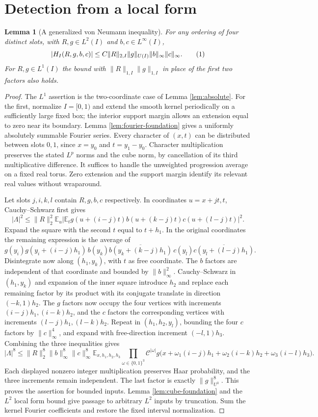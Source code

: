 \documentclass[11pt]{article}
\newtheorem{lemma}[theorem]{Lemma}
\theoremstyle{definition}
\newcommand{\E}{\mathbb E}
\newcommand{\eqtag}[1]{\refstepcounter{equation}\tag{\theequation}\label{#1}}
\numberwithin{equation}{section}
\begin{document}
\section{Detection from a local form}\label{sec:detection}
\begin{lemma}[A generalized von Neumann inequality]\label{lem:von-neumann}
For any ordering of four distinct slots, with $R,g\in L^2(I)$ and $b,c\in L^\infty(I)$,
\[
 |H_I(R,g,b,c)|\le C\|R\|_{2,I}\|g\|_{U(I)}\|b\|_\infty\|c\|_\infty.
 \eqtag{eq:von-neumann}
\]
For $R,g\in L^1(I)$ the bound with $\|R\|_{1,I}\|g\|_{1,I}$ in place of the first two factors also holds.
\end{lemma}
\begin{proof}
The $L^1$ assertion is the two-coordinate case of Lemma \ref{lem:absolute}. For the first, normalize $I=[0,1)$ and extend the smooth kernel periodically on a sufficiently large fixed box; the interior support margin allows an extension equal to zero near its boundary. Lemma \ref{lem:fourier-foundation} gives a uniformly absolutely summable Fourier series. Every character of $(x,t)$ can be distributed between slots $0,1$, since $x=y_0$ and $t=y_1-y_0$. Character multiplication preserves the stated $L^p$ norms and the cube norm, by cancellation of its third multiplicative difference. It suffices to handle the unweighted progression average on a fixed real torus. Zero extension and the support margin identify its relevant real values without wraparound.

Let slots $j,i,k,l$ contain $R,g,b,c$ respectively. In coordinates $u=x+jt,t$, Cauchy--Schwarz first gives
\[
 |\Lambda|^2\le\|R\|_2^2
 \E_u\left|\E_tg(u+(i-j)t)b(u+(k-j)t)c(u+(l-j)t)\right|^2.
\]
Expand the square with the second $t$ equal to $t+h_1$. In the original coordinates the remaining expression is the average of
\[
 g(y_i)\overline{g(y_i+(i-j)h_1)}\,
 b(y_k)\overline{b(y_k+(k-j)h_1)}\,
 c(y_l)\overline{c(y_l+(l-j)h_1)}.
\]
Disintegrate now along $(h_1,y_k)$, with $t$ as free coordinate. The $b$ factors are independent of that coordinate and bounded by $\|b\|_\infty^2$. Cauchy--Schwarz in $(h_1,y_k)$ and expansion of the inner square introduce $h_2$ and replace each remaining factor by its product with its conjugate translate in direction $(-k,1)h_2$. The $g$ factors now occupy the four vertices with increments $(i-j)h_1,(i-k)h_2$, and the $c$ factors the corresponding vertices with increments $(l-j)h_1,(l-k)h_2$. Repeat in $(h_1,h_2,y_l)$, bounding the four $c$ factors by $\|c\|_\infty^4$, and expand with free-direction increment $(-l,1)h_3$. Combining the three inequalities gives
\[
 |\Lambda|^8\le\|R\|_2^8\|b\|_\infty^8\|c\|_\infty^8
 \E_{x,h_1,h_2,h_3}\prod_{\omega\in\{0,1\}^3}
 \mathcal C^{|\omega|}g\bigl(x+\omega_1(i-j)h_1+\omega_2(i-k)h_2+\omega_3(i-l)h_3\bigr).
\]
Each displayed nonzero integer multiplication preserves Haar probability, and the three increments remain independent. The last factor is exactly $\|g\|_{U^3}^8$. This proves the assertion for bounded inputs. Lemma \ref{lem:cube-foundation} and the $L^2$ local form bound give passage to arbitrary $L^2$ inputs by truncation. Sum the kernel Fourier coefficients and restore the fixed interval normalization.
\end{proof}
\end{document}
